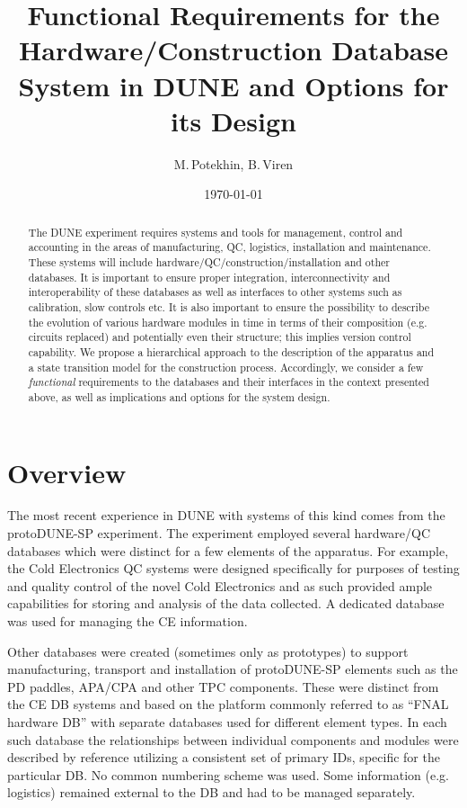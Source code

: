 \documentclass[pdftex,12pt,letter]{article}
\title{Functional Requirements for the Hardware/Construction Database System in DUNE and Options for its Design}
\date{\today}
\author{M.\,Potekhin, B.\,Viren}
\begin{document}
\maketitle

\begin{abstract}
\noindent  The DUNE experiment requires systems and tools for management, control
and accounting  in the areas of manufacturing, QC, logistics, installation and maintenance.
These systems will include hardware/QC/construction/installation and other databases.
It is important to ensure proper integration, interconnectivity and interoperability of these
databases  as well as interfaces to other systems such as calibration, slow controls etc.
It is also important to ensure the possibility to describe the evolution of various hardware modules
in time in terms of their composition (e.g. circuits replaced) and potentially even their structure;
this implies version control capability.
We propose a hierarchical approach to the description of the apparatus and a state transition
model for the construction process. Accordingly, we consider a few \textit{functional}
requirements to the databases and their interfaces  in the context presented above,
as well as implications and options for the system design.

\end{abstract}


\section{Overview}

The most recent experience in DUNE with systems of this kind comes from the protoDUNE-SP
experiment. The experiment employed several hardware/QC databases which were distinct
for a few elements of the apparatus. For example, the Cold Electronics QC systems were designed specifically
for purposes of testing and quality control of the novel Cold Electronics and as such provided ample capabilities
for storing and analysis of the data collected. A dedicated database was used for managing the CE information.

Other databases were created (sometimes only as prototypes) to support manufacturing, transport and installation of 
protoDUNE-SP elements such as the PD paddles, APA/CPA and other TPC components. These were distinct from
the CE DB systems and based on the platform commonly referred to as ``FNAL hardware DB'' \cite{hardwareDB}
with separate databases used for different element types. In each such database the
relationships between individual components and modules were described by reference utilizing a
consistent set of primary IDs, specific for the particular DB. No common numbering scheme was used.
Some information (e.g.\,logistics) remained external to the DB and had to be managed separately.
\end{document}
